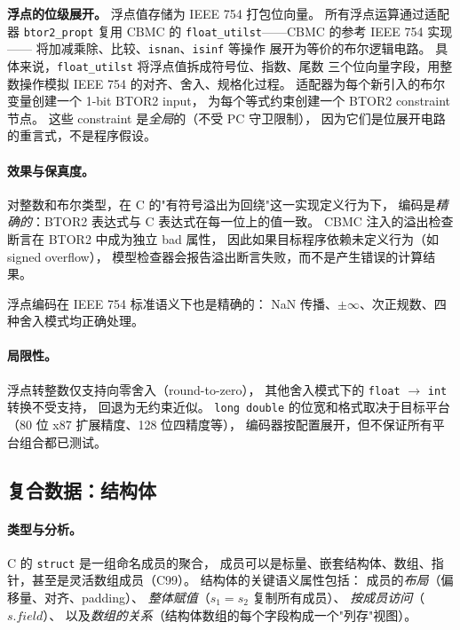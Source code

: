 \documentclass[11pt,a4paper]{article}
\begin{document}
\textbf{浮点的位级展开。}
浮点值存储为 IEEE 754 打包位向量。
所有浮点运算通过适配器 \texttt{btor2\_propt} 复用 CBMC 的
\texttt{float\_utilst}——CBMC 的参考 IEEE 754 实现——
将加减乘除、比较、\texttt{isnan}、\texttt{isinf} 等操作
展开为等价的布尔逻辑电路。
具体来说，\texttt{float\_utilst} 将浮点值拆成符号位、指数、尾数
三个位向量字段，用整数操作模拟 IEEE 754 的对齐、舍入、规格化过程。
适配器为每个新引入的布尔变量创建一个 1-bit BTOR2 input，
为每个等式约束创建一个 BTOR2 constraint 节点。
这些 constraint 是\emph{全局}的（不受 PC 守卫限制），
因为它们是位展开电路的重言式，不是程序假设。

\paragraph{效果与保真度。}
对整数和布尔类型，在 C 的"有符号溢出为回绕"这一实现定义行为下，
编码是\emph{精确的}：BTOR2 表达式与 C 表达式在每一位上的值一致。
CBMC 注入的溢出检查断言在 BTOR2 中成为独立 bad 属性，
因此如果目标程序依赖未定义行为（如 signed overflow），
模型检查器会报告溢出断言失败，而不是产生错误的计算结果。

浮点编码在 IEEE 754 标准语义下也是精确的：
NaN 传播、$\pm\infty$、次正规数、四种舍入模式均正确处理。

\paragraph{局限性。}
浮点转整数仅支持向零舍入（round-to-zero），
其他舍入模式下的 \texttt{float} $\to$ \texttt{int} 转换不受支持，
回退为无约束近似。
\texttt{long double} 的位宽和格式取决于目标平台
（80 位 x87 扩展精度、128 位四精度等），
编码器按配置展开，但不保证所有平台组合都已测试。


\subsection{复合数据：结构体}
\label{sec:struct}

\paragraph{类型与分析。}
C 的 \texttt{struct} 是一组命名成员的聚合，
成员可以是标量、嵌套结构体、数组、指针，甚至是灵活数组成员（C99）。
结构体的关键语义属性包括：
成员的\emph{布局}（偏移量、对齐、padding）、
\emph{整体赋值}（$s_1 = s_2$ 复制所有成员）、
\emph{按成员访问}（$s.field$）、
以及\emph{数组的关系}（结构体数组的每个字段构成一个"列存"视图）。
\end{document}
